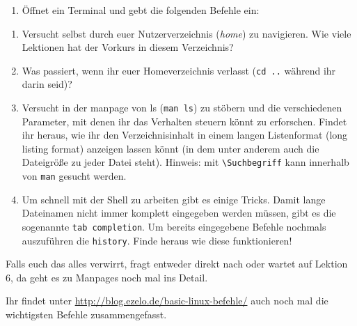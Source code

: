 \begin{praxis}
    \begin{enumerate}
        \item Öffnet ein Terminal und gebt die folgenden Befehle ein:
    \end{enumerate}
\end{praxis}

\begin{spiel}
    \begin{enumerate}
        \item Versucht selbst durch euer Nutzerverzeichnis (\emph{home}) zu navigieren.
              Wie viele Lektionen hat der Vorkurs in diesem Verzeichnis?
        \item Was passiert, wenn ihr euer Homeverzeichnis verlasst (\texttt{cd ..}
              während ihr darin seid)?
        \item Versucht in der manpage von ls (\texttt{man ls}) zu stöbern und die
              verschiedenen Parameter, mit denen ihr das Verhalten steuern könnt zu
              erforschen. Findet ihr heraus, wie ihr den Verzeichnisinhalt in einem
              langen Listenformat (long listing format) anzeigen lassen könnt (in dem
              unter anderem auch die Dateigröße zu jeder Datei steht). 
              Hinweis: mit \texttt{\textbackslash Suchbegriff} kann innerhalb von \texttt{man} gesucht werden.
        \item Um schnell mit der Shell zu arbeiten gibt es einige Tricks. 
        Damit lange Dateinamen nicht immer komplett eingegeben werden müssen, gibt es die sogenannte \texttt{tab completion}. 
        Um bereits eingegebene Befehle nochmals auszuführen die \texttt{history}. Finde heraus wie diese funktionieren!
    \end{enumerate}

    \vspace{5em}

    Falls euch das alles verwirrt, fragt entweder direkt nach oder wartet auf
    Lektion 6, da geht es zu Manpages noch mal ins Detail.

    Ihr findet unter \url{http://blog.ezelo.de/basic-linux-befehle/} auch noch mal
    die wichtigsten Befehle zusammengefasst.
\end{spiel}